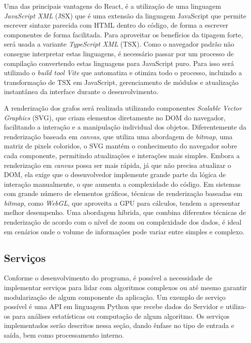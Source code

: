 Uma das principais vantagens do React, é a utilização de uma linguagem \textit{JavaScript XML} (JSX) que  é uma extensão da linguagem JavaScript que permite escrever sintaxe parecida com HTML dentro do código, de forma a escrever componentes de forma facilitada. Para aproveitar os benefícios da tipagem forte, será usada a variante \textit{TypeScript XML} (TSX). Como o navegador padrão não consegue interpretar estas linguagens, é necessário passar por um processo de compilação convertendo estas linguagens para JavaScript puro. Para isso será utilizado o \textit{build tool Vite} que automatiza e otimiza todo o processo, incluindo a transformação de TSX em JavaScript, gerenciamento de módulos e atualização instantânea da interface durante o desenvolvimento.

A renderização dos grafos será realizada utilizando componentes \textit{Scalable Vector Graphics} (SVG), que criam elementos diretamente no DOM do navegador, facilitando a interação e a manipulação individual dos objetos. Diferentemente da renderização baseada em \textit{canvas}, que utiliza uma abordagem de \textit{bitmap}, uma matriz de pixels coloridos, o SVG mantém o conhecimento do navegador sobre cada componente, permitindo atualizações e interações mais simples. Embora a renderização em \textit{canvas} possa ser mais rápida, já que não precisa atualizar o DOM, ela exige que o desenvolvedor implemente grande parte da lógica de interação manualmente, o que aumenta a complexidade do código. Em sistemas com grande número de elementos gráficos, técnicas de renderização baseadas em \textit{bitmap}, como \textit{WebGL}, que aproveita a GPU para cálculos, tendem a apresentar melhor desempenho. Uma abordagem híbrida, que combina diferentes técnicas de renderização de acordo com o nível de zoom ou complexidade dos dados, é ideal em cenários onde o volume de informações pode variar entre simples e complexo.

\subsection{Serviços}
Conforme o desenvolvimento do programa, é possível a necessidade de implementar serviços para lidar com algoritmos complexos ou até mesmo garantir modularização de algum componente da aplicação. Um exemplo de serviço possível é uma API em linguagem Python que recebe dados do Servidor e utiliza-os 
para análises estatísticas ou computação de algum algoritmo. Os serviços implementados serão descritos nessa seção, dando ênfase no tipo de entrada e saída, bem como processamento interno.